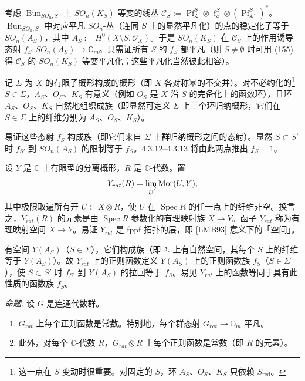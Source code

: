 考虑 $\operatorname{Bun}_{SO_{n},S}$ 上 $SO_{n}(K_{S})$-等变的线丛 $\mathcal{C}_{S}:=\operatorname{Pf}_{\mathcal{L}}^{S}\otimes\ell^{S}_{\mathcal{E}}\otimes(\operatorname{Pf}_{\mathcal{L}'}^{S})^{*}$。$\operatorname{Bun}_{SO_{n},S}$ 中对应平凡 $SO_{n}$-丛（连同 $S$ 上的显然平凡化）的点的稳定化子等于 $SO_{n}(A_{S})$，其中 $A_{S}:=H^{0}(X\setminus S,\mathcal{O}_{X})$。于是 $SO_{n}(K_{S})$ 在 $\mathcal{C}_{S}$ 上的作用诱导态射 $f_{S}:SO_{n}(A_{S})\to\mathbb{G}_{m}$。只需证所有 $S$ 的 $f_{S}$ 都平凡（则 $S\neq\emptyset$ 时可用 (155) 得 $\mathcal{C}_{S}$ 的 $SO_{n}(K_{S})$-等变平凡化；这些平凡化当然彼此相容）。

记 $\Sigma$ 为 $X$ 的有限子概形构成的概形（即 $X$ 各对称幂的不交并）。对不必约化的\footnote{这一点在 $S$ 变动时很重要。对固定的 $S$，环 $A_{S}$、$O_{S}$、$K_{S}$ 只依赖 $S_{\mathrm{red}}$。} $S\in\Sigma$，$A_{S}$、$O_{S}$、$K_{S}$ 有意义（例如 $O_{S}$ 是 $X$ 沿 $S$ 的完备化上的函数环），且环 $A_{S}$、$O_{S}$、$K_{S}$ 自然地组织成族（即显然可定义 $\Sigma$ 上三个环归纳概形，它们在 $S\in\Sigma$ 上的纤维分别为 $A_{S}$、$O_{S}$、$K_{S}$）。

易证这些态射 $f_{S}$ 构成族（即它们来自 $\Sigma$ 上群归纳概形之间的态射）。显然 $S\subset S'$ 时 $f_{S'}$ 到 $SO_{n}(A_{S})$ 的限制等于 $f_{S}$。4.3.12–4.3.13 将由此两点推出 $f_{S}=1$。

 设 $Y$ 是 $\mathbb{C}$ 上有限型的分离概形，$R$ 是 $\mathbb{C}$-代数。置
\[
Y_{rat}(R)=\varinjlim_{U}\operatorname{Mor}(U,Y),
\]
其中极限取遍所有开 $U\subset X\otimes R$，使 $U$ 在 $\operatorname{Spec} R$ 的任一点上的纤维非空。换言之，$Y_{rat}(R)$ 的元素是由 $\operatorname{Spec} R$ 参数化的有理映射族 $X\to Y$。函子 $Y_{rat}$ 称为有理映射空间 $X\to Y$。易证 $Y_{rat}$ 是 fppf 拓扑的层，即 [LMB93] 意义下的「空间」。

有空间 $Y(A_{S})$（$S\in\Sigma$），它们构成族（即 $\Sigma$ 上有自然空间，其每个 $S$ 上的纤维等于 $Y(A_{S})$）。故 $Y_{rat}$ 上的正则函数定义 $Y(A_{S})$ 上的正则函数族 $f_{S}$（$S\in\Sigma$），使 $S\subset S'$ 时 $f_{S'}$ 到 $Y(A_{S})$ 的拉回等于 $f_{S}$。易见 $Y_{rat}$ 上的函数等同于具有此性质的函数族 $f_{S}$。

 \emph{命题.} 设 $G$ 是连通代数群。
\begin{enumerate}[label=(\roman*),leftmargin=2.2em]
\item $G_{rat}$ 上每个正则函数是常数。特别地，每个群态射 $G_{rat}\to\mathbb{G}_{m}$ 平凡。
\item 此外，对每个 $\mathbb{C}$-代数 $R$，$G_{rat}\otimes R$ 上每个正则函数是常数（即 $R$ 的元素）。
\end{enumerate}

